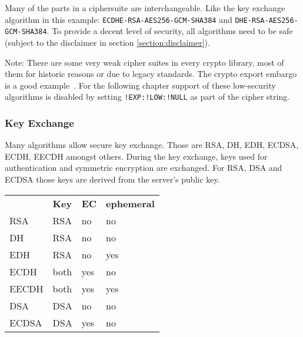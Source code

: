 


Many of the parts in a ciphersuite are interchangeable. Like the key exchange
algorithm in this example: \texttt{ECDHE-RSA-AES256-GCM-SHA384} and
\texttt{DHE-RSA-AES256-GCM-SHA384}.  To provide a decent level of security, all
algorithms need to be safe (subject to the disclaimer in section
\ref{section:disclaimer}).

Note: There are some very weak cipher suites in every crypto library, most of
them for historic reasons or due to legacy standards. The crypto export embargo
is a good example~\cite{Wikipedia:ExportCipher}.  For the following chapter
support of these low-security algorithms is disabled by setting
\texttt{!EXP:!LOW:!NULL} as part of the cipher string.


\subsubsection{Key Exchange}

Many algorithms allow secure key exchange.  Those are RSA, DH, EDH, ECDSA,
ECDH, EECDH amongst others. During the key exchange, keys used for authentication
and symmetric encryption are exchanged. For RSA, DSA and ECDSA those keys are derived
from the server's public key.


\begin{center}
\begin{tabular}{llll}
    \toprule
          & \textbf{Key}  & \textbf{EC}  & \textbf{ephemeral} \\ \cmidrule(lr){1-4}
   RSA    & RSA           & no           & no                 \\
   DH     & RSA           & no           & no                 \\
   EDH    & RSA           & no           & yes                \\
   ECDH   & both          & yes          & no                 \\
   EECDH  & both          & yes          & yes                \\
   DSA    & DSA           & no           & no                 \\
   ECDSA  & DSA           & yes          & no                 \\
\bottomrule
\end{tabular}
\end{center}

